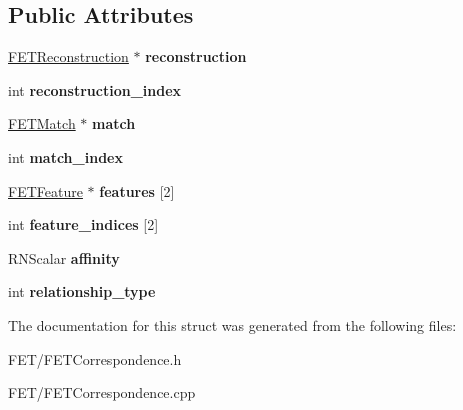 \subsection*{Public Attributes}
\begin{DoxyCompactItemize}
\item 
\hyperlink{struct_f_e_t_reconstruction}{F\+E\+T\+Reconstruction} $\ast$ {\bfseries reconstruction}\hypertarget{struct_f_e_t_correspondence_ab47bb4319abf338d40d0b8fd4e48a5fa}{}\label{struct_f_e_t_correspondence_ab47bb4319abf338d40d0b8fd4e48a5fa}

\item 
int {\bfseries reconstruction\+\_\+index}\hypertarget{struct_f_e_t_correspondence_abe7aa8ad7c16f3687920cf1a9ab5cf6a}{}\label{struct_f_e_t_correspondence_abe7aa8ad7c16f3687920cf1a9ab5cf6a}

\item 
\hyperlink{struct_f_e_t_match}{F\+E\+T\+Match} $\ast$ {\bfseries match}\hypertarget{struct_f_e_t_correspondence_a7c874ea2d0edfa90346705312d59c78b}{}\label{struct_f_e_t_correspondence_a7c874ea2d0edfa90346705312d59c78b}

\item 
int {\bfseries match\+\_\+index}\hypertarget{struct_f_e_t_correspondence_ab8d00ec3d1fb8292fe57d740e9701e1e}{}\label{struct_f_e_t_correspondence_ab8d00ec3d1fb8292fe57d740e9701e1e}

\item 
\hyperlink{struct_f_e_t_feature}{F\+E\+T\+Feature} $\ast$ {\bfseries features} \mbox{[}2\mbox{]}\hypertarget{struct_f_e_t_correspondence_a99021497dc7c9be83a569d93bd102468}{}\label{struct_f_e_t_correspondence_a99021497dc7c9be83a569d93bd102468}

\item 
int {\bfseries feature\+\_\+indices} \mbox{[}2\mbox{]}\hypertarget{struct_f_e_t_correspondence_ac1b122c6d2863f6009ec1b97105c5eb4}{}\label{struct_f_e_t_correspondence_ac1b122c6d2863f6009ec1b97105c5eb4}

\item 
R\+N\+Scalar {\bfseries affinity}\hypertarget{struct_f_e_t_correspondence_a237f3aa825fdd5b10f4eba5cdeba4f8a}{}\label{struct_f_e_t_correspondence_a237f3aa825fdd5b10f4eba5cdeba4f8a}

\item 
int {\bfseries relationship\+\_\+type}\hypertarget{struct_f_e_t_correspondence_a463e740ea252ba37523787966324b424}{}\label{struct_f_e_t_correspondence_a463e740ea252ba37523787966324b424}

\end{DoxyCompactItemize}


The documentation for this struct was generated from the following files\+:\begin{DoxyCompactItemize}
\item 
F\+E\+T/F\+E\+T\+Correspondence.\+h\item 
F\+E\+T/F\+E\+T\+Correspondence.\+cpp\end{DoxyCompactItemize}
